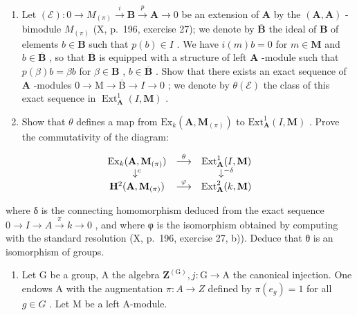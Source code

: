 \begin{enumerate}
\def\labelenumi{\alph{enumi})}
\item
  Let \((\mathcal{E}):0\to M_{(\pi)}\stackrel{i}{\to}\mathbf{B}\stackrel{p}{\to}\mathbf{A}\to 0\) be an extension of \(\mathbf{A}\) by the \((\mathbf{A},\mathbf{A})\) -bimodule \(M_{(\pi)}\) (X, p.~196, exercise 27); we denote by \(\overline{\mathbf{B}}\) the ideal of \(\mathbf{B}\) of elements \(b\in \mathbf{B}\) such that \(p(b)\in I\) . We have \(i(m)b = 0\) for \(m\in \mathbf{M}\) and \(b\in \overline{\mathbf{B}}\) , so that \(\overline{\mathbf{B}}\) is equipped with a structure of left \(\mathbf{A}\) -module such that \(p(\beta)b = \beta b\) for \(\beta \in \mathbf{B}\) , \(b\in \overline{\mathbf{B}}\) . Show that there exists an exact sequence of \(\mathbf{A}\) -modules \(0\to \mathrm{M}\to \overline{\mathrm{B}}\to I\to 0\) ; we denote by \(\theta (\mathcal{E})\) the class of this exact sequence in \(\operatorname {Ext}_{\mathbf{A}}^{1}(I,\mathbf{M})\) .
\item
  Show that \(\theta\) defines a map from \(\mathrm{Ex}_{k}(\mathbf{A},\mathbf{M}_{(\pi)})\) to \(\mathrm{Ext}_{\mathbf{A}}^{1}(I,\mathbf{M})\) . Prove the commutativity of the diagram:
\end{enumerate}

\[
\begin{array}{c c c} \operatorname{Ex} _ {k} (\mathbf {A}, \mathbf {M} _ {(\pi)}) & \stackrel {{\theta}} {{\longrightarrow}} & \operatorname{Ext} _ {\mathbf {A}} ^ {1} (I, \mathbf {M}) \\ \downarrow^ {c} & & \downarrow^ {- \delta} \\ \mathbf {H} ^ {2} (\mathbf {A}, \mathbf {M} _ {(\pi)}) & \stackrel {{\varphi}} {{\longrightarrow}} & \operatorname{Ext} _ {\mathbf {A}} ^ {2} (k, \mathbf {M}) \end{array}
\]

where δ is the connecting homomorphism deduced from the exact sequence \(0 \rightarrow I \rightarrow A \xrightarrow{\pi} k \rightarrow 0\) , and where φ is the isomorphism obtained by computing with the standard resolution (X, p.~196, exercise 27, b)). Deduce that θ is an isomorphism of groups.

\begin{enumerate}
\def\labelenumi{\arabic{enumi})}
\setcounter{enumi}{2}
\tightlist
\item
  Let G be a group, A the algebra \(\mathbf{Z}^{(\mathrm{G})}, j: \mathrm{G} \to \mathrm{A}\) the canonical injection. One endows A with the augmentation \(\pi: A \to Z\) defined by \(\pi(e_g) = 1\) for all \(g \in G\) . Let M be a left A-module.
\end{enumerate}

